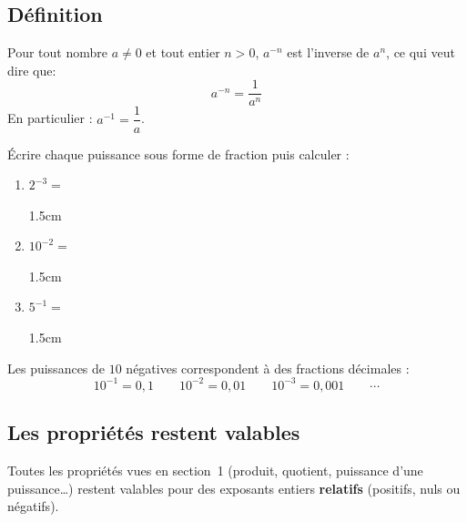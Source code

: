 \documentclass[a4paper]{book}
\begin{document}
\subsection{Définition}

    \begin{definition}
        Pour tout nombre $a \neq 0$ et tout entier $n > 0$, $a^{-n}$ est l'inverse de  $a^n$, ce qui veut dire que:
        \[
            a^{-n} = \frac{1}{a^n}
        \]
        En particulier : $a^{-1} = \dfrac{1}{a}$.
    \end{definition}

    \begin{exemple}
        Écrire chaque puissance sous forme de fraction puis calculer :
        \begin{enumerate}
            \item $2^{-3} = $
            \begin{ZoneReponse}{1.5cm}
            \end{ZoneReponse}

            \item $10^{-2} = $
            \begin{ZoneReponse}{1.5cm}
            \end{ZoneReponse}

            \item $5^{-1} = $
            \begin{ZoneReponse}{1.5cm}
            \end{ZoneReponse}
        \end{enumerate}
    \end{exemple}

    \begin{remarque}
        Les puissances de $10$ négatives correspondent à des fractions décimales :
        \[
            10^{-1} = 0{,}1 \qquad 10^{-2} = 0{,}01 \qquad 10^{-3} = 0{,}001 \qquad \cdots
        \]
    \end{remarque}


\newpage


\subsection{Les propriétés restent valables}

    \begin{propriete}
        Toutes les propriétés vues en section~1 (produit, quotient, puissance d'une puissance…) restent valables pour des exposants entiers \textbf{relatifs} (positifs, nuls ou négatifs).
    \end{propriete}
\end{document}
